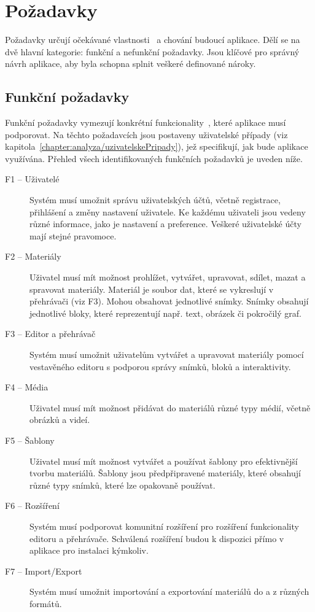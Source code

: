\section{Požadavky}

Požadavky určují očekávané vlastnosti~\cite{uml_2007} a chování budoucí aplikace. Dělí se na dvě hlavní kategorie: funkční a nefunkční požadavky. Jsou klíčové pro správný návrh aplikace, aby byla schopna splnit veškeré definované nároky.

\subsection{Funkční požadavky}

Funkční požadavky vymezují konkrétní funkcionality~\cite{uml_2007}, které aplikace musí podporovat. Na těchto požadavcích jsou postaveny uživatelské případy (viz kapitola~\ref{chapter:analyza/uzivatelskePripady}), jež specifikují, jak bude aplikace využívána. Přehled všech identifikovaných funkčních požadavků je uveden níže.

\begin{description}
    \item[F1 -- Uživatelé]
    Systém musí umožnit správu uživatelských účtů, včetně registrace, přihlášení a změny nastavení uživatele. Ke každému uživateli jsou vedeny různé informace, jako je nastavení a preference. Veškeré uživatelské účty mají stejné pravomoce.
    
    \item[F2 -- Materiály]
    Uživatel musí mít možnost prohlížet, vytvářet, upravovat, sdílet, mazat a spravovat materiály. Materiál je soubor dat, které se vykreslují v přehrávači (viz F3). Mohou obsahovat jednotlivé snímky. Snímky obsahují jednotlivé bloky, které reprezentují např. text, obrázek či pokročilý graf.
    
    \item[F3 -- Editor a přehrávač]
    Systém musí umožnit uživatelům vytvářet a upravovat materiály pomocí vestavěného editoru s podporou správy snímků, bloků a interaktivity.
    
    \item[F4 -- Média]
    Uživatel musí mít možnost přidávat do materiálů různé typy médií, včetně obrázků a videí.
    
    \item[F5 -- Šablony]
    Uživatel musí mít možnost vytvářet a používat šablony pro efektivnější tvorbu materiálů. Šablony jsou předpřipravené materiály, které obsahují různé typy snímků, které lze opakovaně používat. 
    
    \item[F6 -- Rozšíření]
    Systém musí podporovat komunitní rozšíření pro rozšíření funkcionality editoru a přehrávače.
    Schválená rozšíření budou k dispozici přímo v aplikace pro instalaci kýmkoliv.
    
    \item[F7 -- Import/Export]
    Systém musí umožnit importování a exportování materiálů do a z různých formátů.
\end{description}




